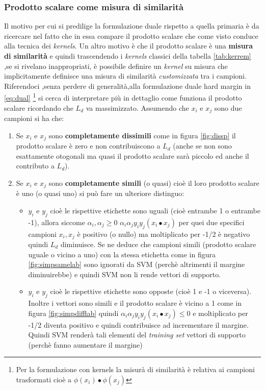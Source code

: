 \subsubsection{Prodotto scalare come misura di similarità}
Il motivo per cui si predilige la formulazione duale rispetto a quella primaria è da ricercare nel fatto che in essa compare il prodotto scalare che come visto conduce alla tecnica dei \textit{kernels}. Un altro motivo è che il prodotto scalare è una \textbf{misura di similarità} e quindi trascendendo i \textit{kernels} classici della tabella \ref{tab:kerrem} ,se si rivelano inappropriati, è possibile definire un \textit{kernel} su misura che implicitamente definisce una misura di similarità \textit{customizzata} tra i campioni. Riferendoci ,senza perdere di generalità,alla formulazione duale hard margin in \eqref{eq:dual} \footnote{Per la formulazione con kernels la misurà di similarità è relativa ai campioni trasformati cioè a $\phi(x_i) \bullet \phi(x_j)$} si cerca di interpretare più in dettaglio come funziona il prodotto scalare ricordando che $L_d$ va massimizzato. Assumendo che $x_i$ e $x_j$ sono due campioni  si ha che:
\begin{enumerate}
\item Se $x_i \text{ e } x_j$ sono \textbf{completamente dissimili} come in figura \ref{fig:dissp} il prodotto scalare è zero e non contribuiscono a $L_d$ (anche se non sono esattamente otogonali ma quasi il prodotto scalare sarà piccolo ed anche il contributo a $L_d$).
\item Se $x_i \text{ e } x_j$ sono \textbf{completamente simili} (o quasi) cioè il loro prodotto scalare è uno (o quasi uno) si può fare un ulteriore distinguo:
\begin{itemize}
\item $y_i \text{ e } y_j$ cioè le rispettive etichette sono uguali (cioè entrambe 1 o entrambe -1), allora siccome $\alpha_i,\alpha_j \geq 0$ $\alpha_i\alpha_jy_iy_j(x_i \bullet x_j)$ per quei due specifici campioni $x_i,x_j$ è positivo (o nullo) ma moltiplicato per -1/2 è negativo quindi $L_d$ diminuisce. Se ne deduce che campioni simili (prodotto scalare uguale o vicino a uno) con la stessa etichetta come in figura \ref{fig:simpsamelab} sono ignorati da \ac{SVM} (perchè altrimenti il margine diminuirebbe) e quindi \ac{SVM} non li rende vettori di supporto.
\item $y_i \text{ e } y_j$ cioè le rispettive etichette sono opposte (cioè 1 e -1 o viceversa). Inoltre i vettori sono simili e il prodotto scalare è vicino a 1 come in figura \ref{fig:simpdifflab} quindi $\alpha_i\alpha_jy_iy_j(x_i \bullet x_j) \leq 0$ e moltiplicato per -1/2 diventa positivo e quindi contribuisce ad incrementare il margine. Quindi \ac{SVM} renderà tali elementi del \textit{training set} vettori di supporto (perchè fanno aumentare il margine) 
\end{itemize}
\end{enumerate}


